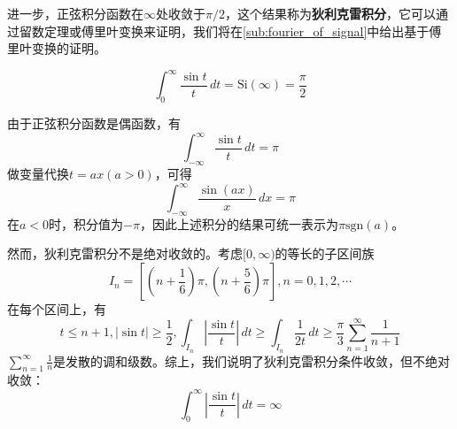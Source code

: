 \documentclass{ctexbook}
\begin{document}
进一步，正弦积分函数在$\infty$处收敛于$\pi/2$，这个结果称为\textbf{狄利克雷积分}，它可以通过留数定理或傅里叶变换来证明，我们将在\ref{sub:fourier_of_signal}中给出基于傅里叶变换的证明。
\begin{theorem}[狄利克雷积分]
    \[\int_{0}^{\infty}\frac{\sin t}{t}\,dt=\text{Si}(\infty)=\frac{\pi}{2}\]
\end{theorem}

\begin{corollary}
    由于正弦积分函数是偶函数，有
    \[\int_{-\infty}^{\infty}\frac{\sin t}{t}\,dt=\pi\]
    做变量代换$t=ax(a>0)$，可得
    \[\int_{-\infty}^{\infty}\frac{\sin (ax)}{x}\,dx=\pi\]
    在$a<0$时，积分值为$-\pi$，因此上述积分的结果可统一表示为$\pi\text{sgn}(a)$。
\end{corollary}

然而，狄利克雷积分不是绝对收敛的。考虑$[0,\infty)$的等长的子区间族
$$I_n=\left[(n+\frac{1}{6})\pi,(n+\frac{5}{6})\pi\right],n=0,1,2,\cdots$$
在每个区间上，有
$$t\leq n+1,|\sin t|\geq \frac{1}{2},\int_{I_n}\left|\frac{\sin t}{t}\right|\,dt \geq \int_{I_n}\frac{1}{2t}\,dt\geq\frac{\pi}{3}\sum_{n=1}^{\infty}\frac{1}{n+1}$$
$\sum_{n=1}^{\infty}\frac{1}{n}$是发散的调和级数。综上，我们说明了狄利克雷积分条件收敛，但不绝对收敛：
$$\int_{0}^{\infty}\left|\frac{\sin t}{t}\right|\,dt=\infty$$



\end{document}
